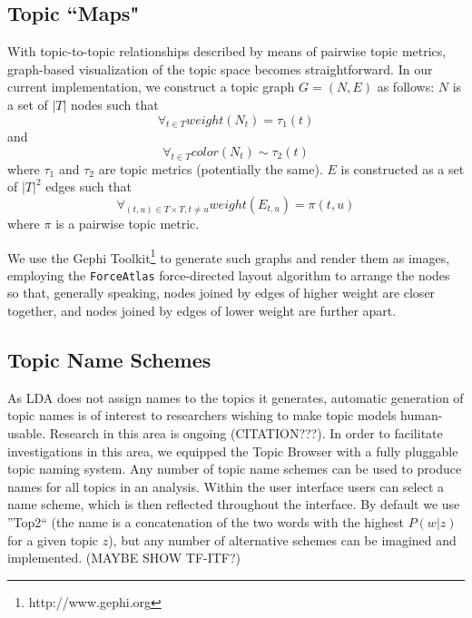 \documentclass[11pt]{article}
\begin{document}
% 


\subsection{Topic ``Maps"}
With topic-to-topic relationships described by means of pairwise topic metrics,
graph-based visualization of the topic space becomes straightforward. In our
current implementation, we construct a topic graph $G = (N, E)$ as follows:
$N$ is a set of $|T|$ nodes such that
\[\forall_{t\in T} weight(N_{t}) = \tau_{1}(t)\]
and
\[\forall_{t\in T} color(N_{t}) \sim \tau_{2}(t)\]
where $\tau_1$ and $\tau_2$ are topic metrics (potentially the same). $E$ is
constructed as a set of $|T|^2$ edges such that
  \[\forall_{(t,u)\in T\times T, t\neq u} weight(E_{t,u}) = \pi(t,u)\]
where $\pi$ is a pairwise topic metric.

We use the Gephi Toolkit\footnote{http://www.gephi.org} to generate such graphs
and render them as images, employing the \texttt{ForceAtlas} force-directed
layout algorithm to arrange the nodes so that, generally speaking, nodes joined
by edges of higher weight are closer together, and nodes joined by edges of
lower weight are further apart.

\subsection{Topic Name Schemes}
As LDA does not assign names to the topics it generates, automatic generation of
topic names is of interest to researchers wishing to make topic models
human-usable. Research in this area is ongoing (CITATION???). In order to
facilitate investigations in this area, we equipped the Topic Browser with a
fully pluggable topic naming system. Any number of topic name schemes can be
used to produce names for all topics in an analysis. Within the user interface
users can select a name scheme, which is then reflected throughout the
interface. By default we use ''Top2`` (the name is a concatenation of the two
words with the highest $P(w|z)$ for a given topic $z$), but any number of
alternative schemes can be imagined and implemented. (MAYBE SHOW TF-ITF?)
\end{document}
